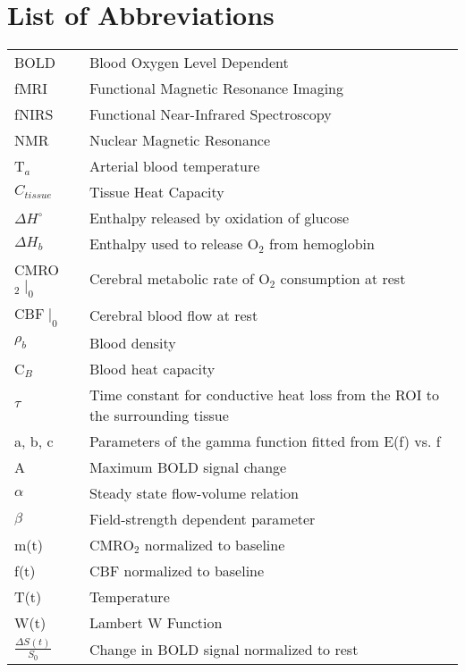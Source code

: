 \chapter*{List of Abbreviations}
\begin{table*}[h]
  \small
    \begin{tabular*}{\linewidth}{l l}
      BOLD & Blood Oxygen Level Dependent \\
      fMRI & Functional Magnetic Resonance Imaging \\
      fNIRS & Functional Near-Infrared Spectroscopy\\
      NMR & Nuclear Magnetic Resonance \\
      T$_{a}$ & Arterial blood temperature \\
      $C_{tissue}$ & Tissue Heat Capacity \\
      $\Delta H^{\circ}$ & Enthalpy released by oxidation of glucose \\
      $\Delta H_{b}$ & Enthalpy used to release O$_{2}$ from hemoglobin \\
      CMRO$_{2}\mid_{0}$ & Cerebral metabolic rate of O$_{2}$ consumption at rest \\
      CBF$\mid_{0}$ & Cerebral blood flow at rest \\
      $\rho_{b}$ & Blood density \\
      C$_{B}$ & Blood heat capacity \\
      $\tau$ & Time constant for conductive heat loss from the ROI to the surrounding tissue \\
      a, b, c & Parameters of the gamma function fitted from E(f) vs. f \\
      A & Maximum BOLD signal change \\
      $\alpha$ & Steady state flow-volume relation \\
      $\beta$ & Field-strength dependent parameter \\
      m(t) & CMRO$_2$ normalized to baseline \\
      f(t) & CBF normalized to baseline \\
      T(t) & Temperature \\
      W(t) & Lambert W Function \\
      $\frac{\Delta S(t)}{S_0}$ & Change in BOLD signal normalized to rest \\
    \end{tabular*}
\end{table*}